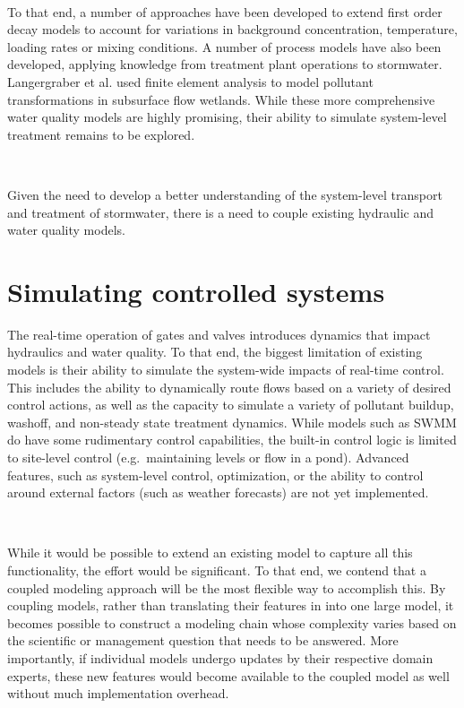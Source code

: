 \

To that end, a number of approaches have been developed to extend first order decay models to account for variations in background concentration\cite{Shepherd2001Time-DependentConstr}, temperature\cite{Kadlec2008TreatmentWetlands}, loading rates\cite{Mitchell2001AlternativeKinetics} or mixing conditions\cite{Persson2003HowPonds,Wong2006ModellingApproach}. A number of process models have also been developed, applying knowledge from treatment plant operations to stormwater\cite{Langergraber2008ModelingReview}. Langergraber et al.\cite{Langergraber2009CWM1:Wetlands,NterLangergraber2005ModelingWetlands} used finite element analysis to model pollutant transformations in  subsurface flow wetlands. While these more comprehensive water quality models are highly promising, their ability to simulate system-level treatment remains to be explored.

\

Given the need to develop a better understanding of the system-level transport and treatment of stormwater, there is a need to couple existing hydraulic and water quality models. 



\section{Simulating controlled systems}
The real-time operation of gates and valves introduces dynamics that impact hydraulics and water quality.
To that end, the biggest limitation of existing models is their ability to simulate the system-wide impacts of real-time control.
This includes the ability to dynamically route flows based on a variety of desired control actions, as well as the capacity to simulate a variety of pollutant buildup, washoff, and non-steady state treatment dynamics. 
While models such as SWMM do have some rudimentary control capabilities, the built-in control logic is limited to site-level control (e.g.\ maintaining levels or flow in a pond)\cite{Rossman2010Storm5.1}.
Advanced features, such as system-level control, optimization, or the ability to control around external factors (such as weather forecasts) are not yet implemented\cite{Ria2016MatSWMMSystems}. 

\

While it would be possible to extend an existing model to capture all this functionality, the effort would be significant. To that end, we contend that a coupled modeling approach\cite{Goodall2011ModelingParadigm}  will be the most flexible way to accomplish this. By coupling models, rather than translating their features in  into one large model, it becomes possible to construct a modeling chain whose complexity varies based on the scientific or management question that needs to be answered. More importantly, if individual models undergo updates by their respective domain experts, these new features would become available to the coupled model as well without much implementation overhead. 

